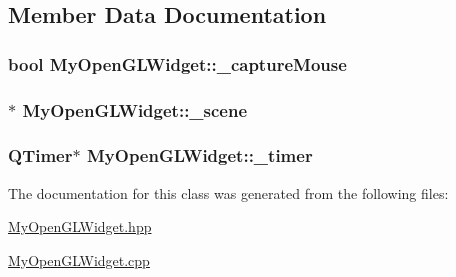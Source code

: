 \subsection{Member Data Documentation}
\hypertarget{class_my_open_g_l_widget_af001d889fec5469aa3e67c11ae48b29d}{
\subsubsection[{\+\_\+capture\+Mouse}]{\setlength{\rightskip}{0pt plus 5cm}bool My\+Open\+G\+L\+Widget\+::\+\_\+capture\+Mouse\hspace{0.3cm}{\ttfamily [private]}}}\label{class_my_open_g_l_widget_af001d889fec5469aa3e67c11ae48b29d}
\hypertarget{class_my_open_g_l_widget_a26a1f259357dd7c8822d715d81591395}{
\subsubsection[{\+\_\+scene}]{$\ast$ My\+Open\+G\+L\+Widget\+::\+\_\+scene\hspace{0.3cm}{\ttfamily [private]}}}\label{class_my_open_g_l_widget_a26a1f259357dd7c8822d715d81591395}
\hypertarget{class_my_open_g_l_widget_aa6ba509f0ef6e8c2d266b83e1d380eb8}{
\subsubsection[{\+\_\+timer}]{\setlength{\rightskip}{0pt plus 5cm}Q\+Timer$\ast$ My\+Open\+G\+L\+Widget\+::\+\_\+timer\hspace{0.3cm}{\ttfamily [private]}}}\label{class_my_open_g_l_widget_aa6ba509f0ef6e8c2d266b83e1d380eb8}


The documentation for this class was generated from the following files\+:\begin{DoxyCompactItemize}
\item 
\hyperlink{_my_open_g_l_widget_8hpp}{My\+Open\+G\+L\+Widget.\+hpp}\item 
\hyperlink{_my_open_g_l_widget_8cpp}{My\+Open\+G\+L\+Widget.\+cpp}\end{DoxyCompactItemize}
